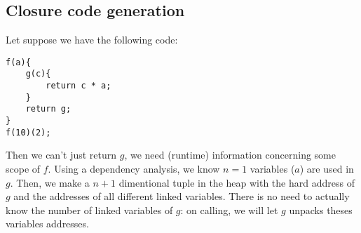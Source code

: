 \documentclass{article}
\begin{document}
		\subsection{Closure code generation}
			Let suppose we have the following code:

\begin{lstlisting}
f(a){
	g(c){
		return c * a;
	}
	return g;
}
f(10)(2);
\end{lstlisting}
			Then we can't just return $g$, we need (runtime) information concerning some scope of $f$. Using a dependency analysis, we know $n=1$ variables ($a$) are used in $g$. Then, we make a $n+1$ dimentional tuple in the heap with the hard address of $g$ and the addresses of all different linked variables. There is no need to actually know the number of linked variables of $g$: on calling, we will let $g$ unpacks theses variables addresses.
\end{document}
